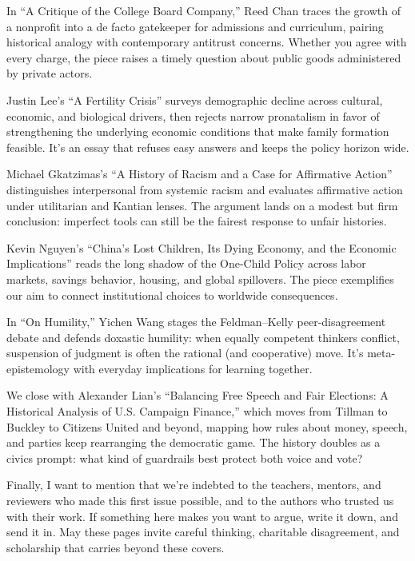 \documentclass[12pt, letter, openany]{book}
\begin{document}
In “A Critique of the College Board Company,” Reed Chan traces the growth of a nonprofit into a de facto gatekeeper for admissions and curriculum, pairing historical analogy with contemporary antitrust concerns. Whether you agree with every charge, the piece raises a timely question about public goods administered by private actors. 

Justin Lee’s “A Fertility Crisis” surveys demographic decline across cultural, economic, and biological drivers, then rejects narrow pronatalism in favor of strengthening the underlying economic conditions that make family formation feasible. It’s an essay that refuses easy answers and keeps the policy horizon wide. 

Michael Gkatzimas’s “A History of Racism and a Case for Affirmative Action” distinguishes interpersonal from systemic racism and evaluates affirmative action under utilitarian and Kantian lenses. The argument lands on a modest but firm conclusion: imperfect tools can still be the fairest response to unfair histories. 

Kevin Nguyen’s “China’s Lost Children, Its Dying Economy, and the Economic Implications” reads the long shadow of the One-Child Policy across labor markets, savings behavior, housing, and global spillovers. The piece exemplifies our aim to connect institutional choices to worldwide consequences. 

In “On Humility,” Yichen Wang stages the Feldman–Kelly peer-disagreement debate and defends doxastic humility: when equally competent thinkers conflict, suspension of judgment is often the rational (and cooperative) move. It’s meta-epistemology with everyday implications for learning together. 

We close with Alexander Lian’s “Balancing Free Speech and Fair Elections: A Historical Analysis of U.S. Campaign Finance,” which moves from Tillman to Buckley to Citizens United and beyond, mapping how rules about money, speech, and parties keep rearranging the democratic game. The history doubles as a civics prompt: what kind of guardrails best protect both voice and vote?

Finally, I want to mention that we’re indebted to the teachers, mentors, and reviewers who made this first issue possible, and to the authors who trusted us with their work. If something here makes you want to argue, write it down, and send it in. May these pages invite careful thinking, charitable disagreement, and scholarship that carries beyond these covers.

\medskip
\end{document}
